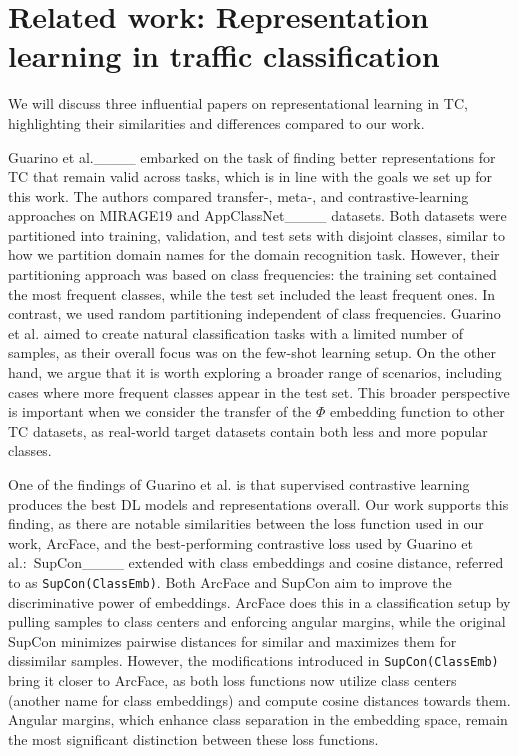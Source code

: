 \section{Related work: Representation learning in traffic classification}
\label{sec:related-work}
We will discuss three influential papers on representational learning in TC, highlighting their similarities and differences compared to our work.

Guarino et al.____ embarked on the task of finding better representations for TC that remain valid across tasks, which is in line with the goals we set up for this work. The authors compared transfer-, meta-, and contrastive-learning approaches on MIRAGE19 and AppClassNet____ datasets. Both datasets were partitioned into training, validation, and test sets with disjoint classes, similar to how we partition domain names for the domain recognition task. However, their partitioning approach was based on class frequencies: the training set contained the most frequent classes, while the test set included the least frequent ones. In contrast, we used random partitioning independent of class frequencies. Guarino et al. aimed to create natural classification tasks with a limited number of samples, as their overall focus was on the few-shot learning setup. On the other hand, we argue that it is worth exploring a broader range of scenarios, including cases where more frequent classes appear in the test set. This broader perspective is important when we consider the transfer of the $\Phi$ embedding function to other TC datasets, as real-world target datasets contain both less and more popular classes.

One of the findings of Guarino et al. is that supervised contrastive learning produces the best DL models and representations overall. Our work supports this finding, as there are notable similarities between the loss function used in our work, ArcFace, and the best-performing contrastive loss used by Guarino et al.:~SupCon____ extended with class embeddings and cosine distance, referred to as \texttt{SupCon(ClassEmb)}. Both ArcFace and SupCon aim to improve the discriminative power of embeddings. ArcFace does this in a classification setup by pulling samples to class centers and enforcing angular margins, while the original SupCon minimizes pairwise distances for similar and maximizes them for dissimilar samples. However, the modifications introduced in \texttt{SupCon(ClassEmb)} bring it closer to ArcFace, as both loss functions now utilize class centers (another name for class embeddings) and compute cosine distances towards them. Angular margins, which enhance class separation in the embedding space, remain the most significant distinction between these loss functions.

